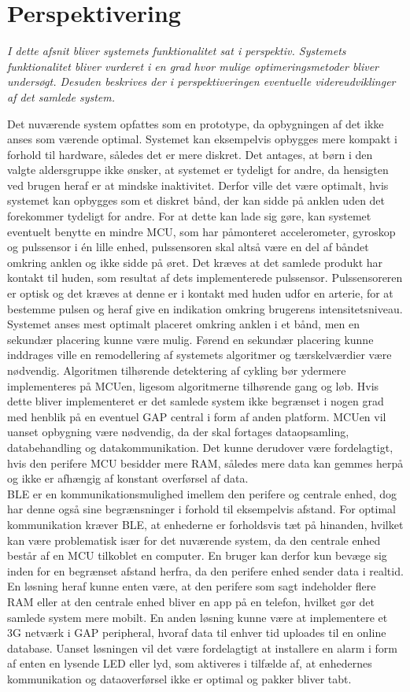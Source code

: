 \section{Perspektivering}
\textit{I dette afsnit bliver systemets funktionalitet sat i perspektiv. Systemets funktionalitet bliver vurderet i en grad hvor mulige optimeringsmetoder bliver undersøgt. Desuden beskrives der i perspektiveringen eventuelle videreudviklinger af det samlede system.}

Det nuværende system opfattes som en prototype, da opbygningen af det ikke anses som værende optimal. Systemet kan eksempelvis opbygges mere kompakt i forhold til hardware, således det er mere diskret. Det antages, at børn i den valgte aldersgruppe ikke ønsker, at systemet er tydeligt for andre, da hensigten ved brugen heraf er at mindske inaktivitet. Derfor ville det være optimalt, hvis systemet kan opbygges som et diskret bånd, der kan sidde på anklen uden det forekommer tydeligt for andre. For at dette kan lade sig gøre, kan systemet eventuelt benytte en mindre MCU, som har påmonteret accelerometer, gyroskop og pulssensor i én lille enhed, pulssensoren skal altså være en del af båndet omkring anklen og ikke sidde på øret. Det kræves at det samlede produkt har kontakt til huden, som resultat af dets implementerede pulssensor. Pulssensoreren er optisk og det kræves at denne er i kontakt med huden udfor en arterie, for at bestemme pulsen og heraf give en indikation omkring brugerens intensitetsniveau. Systemet anses mest optimalt placeret omkring anklen i et bånd, men en sekundær placering kunne være mulig. Førend en sekundær placering kunne inddrages ville en remodellering af systemets algoritmer og tærskelværdier være nødvendig. Algoritmen tilhørende detektering af cykling bør ydermere implementeres på MCUen, ligesom algoritmerne tilhørende gang og løb. Hvis dette bliver implementeret er det samlede system ikke begrænset i nogen grad med henblik på en eventuel GAP central i form af anden platform. MCUen vil uanset opbygning være nødvendig, da der skal fortages dataopsamling, databehandling og datakommunikation. Det kunne derudover være fordelagtigt, hvis den perifere MCU besidder mere RAM, således mere data kan gemmes herpå og ikke er afhængig af konstant overførsel af data. \\
BLE er en kommunikationsmulighed imellem den perifere og centrale enhed, dog har denne også sine begrænsninger i forhold til eksempelvis afstand. For optimal kommunikation kræver BLE, at enhederne er forholdsvis tæt på hinanden, hvilket kan være problematisk især for det nuværende system, da den centrale enhed består af en MCU tilkoblet en computer. En bruger kan derfor kun bevæge sig inden for en begrænset afstand herfra, da den perifere enhed sender data i realtid. En løsning heraf kunne enten være, at den perifere som sagt indeholder flere RAM eller at den centrale enhed bliver en app på en telefon, hvilket gør det samlede system mere mobilt. En anden løsning kunne være at implementere et 3G netværk i GAP peripheral, hvoraf data til enhver tid uploades til en online database. Uanset løsningen vil det være fordelagtigt at installere en alarm i form af enten en lysende LED eller lyd, som aktiveres i tilfælde af, at enhedernes kommunikation og dataoverførsel ikke er optimal og pakker bliver tabt. 

